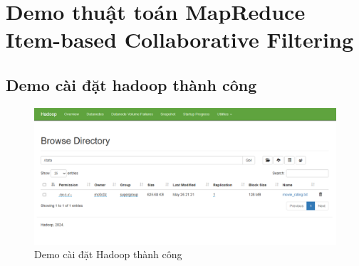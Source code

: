 \documentclass{report}
\begin{document}
\section{Demo thuật toán MapReduce Item-based Collaborative Filtering}
\pagebreak
\subsection*{Demo cài đặt hadoop thành công}
\begin{figure}[h]
    \centering
    \includegraphics[width=12cm]{images/Demo1.png}
    \caption{Demo cài đặt Hadoop thành công}
\end{figure}
\end{document}
